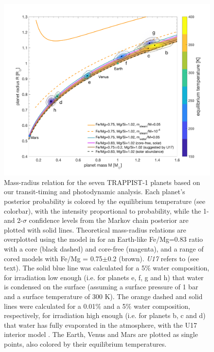 \documentclass[twocolumn]{aastex63}
\begin{document}
\begin{figure}
    \centering
    \includegraphics[width=\hsize]{figures/Figure_MR_v8.png}
    {Mass-radius relation for the seven TRAPPIST-1 planets based on
        our transit-timing and photodynamic analysis.
        Each planet's posterior probability is colored by the equilibrium temperature
        (see colorbar), with the intensity proportional to probability, while the 1- and 2-$\sigma$
        confidence levels from the Markov chain posterior are plotted with solid lines.
        Theoretical mass-radius relations are overplotted using the model in \citet{Dorn2016} for an Earth-like Fe/Mg=0.83 ratio with a core (black dashed) and core-free (magenta), and a range of cored models with Fe/Mg = 0.75$\pm$0.2 (brown).  {\it U17} refers to \citet{Unterborn2018a} (see text).
        The solid blue line was calculated for a 5$\%$ water composition, for irradiation low enough (i.e. for planets e, f, g and h) that water is condensed on the surface  (assuming a surface pressure of 1 bar and a surface temperature of 300 K). The orange dashed and solid lines were calculated for a 0.01$\%$ and a 5$\%$ water composition, respectively, for irradiation high enough (i.e. for planets b, c and d) that water has fully evaporated in the atmosphere, with the U17 interior model \citep{Turbet2020}.
        The Earth, Venus and Mars are plotted as single points, also colored by their equilibrium temperatures.}
    \label{fig:mass_radius_relation}
\end{figure}
\end{document}
